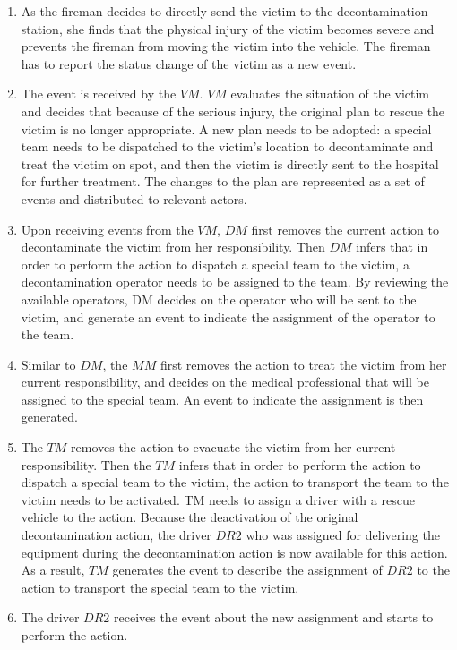 \begin{enumerate}
	\item As the fireman decides to directly send the victim to the decontamination station, she finds that the physical injury of the victim becomes severe and prevents the fireman from moving the victim into the vehicle. The fireman has to report the status change of the victim as a new event.
	\item The event is received by the $VM$. $VM$ evaluates the situation of the victim and decides that because of the serious injury, the original plan to rescue the victim is no longer appropriate. A new plan needs to be adopted: a special team needs to be dispatched to the victim’s location to decontaminate and treat the victim on spot, and then the victim is directly sent to the hospital for further treatment. The changes to the plan are represented as a set of events and distributed to relevant actors.
	\item Upon receiving events from the $VM$, $DM$ first removes the current action to decontaminate the victim from her responsibility. Then $DM$ infers that in order to perform the action to dispatch a special team to the victim, a decontamination operator needs to be assigned to the team. By reviewing the available operators, DM decides on the operator who will be sent to the victim, and generate an event to indicate the assignment of the operator to the team.
	\item Similar to $DM$, the $MM$ first removes the action to treat the victim from her current responsibility, and decides on the medical professional that will be assigned to the special team. An event to indicate the assignment is then generated.
	\item The $TM$ removes the action to evacuate the victim from her current responsibility. Then the $TM$ infers that in order to perform the action to dispatch a special team to the victim, the action to transport the team to the victim needs to be activated. TM needs to assign a driver with a rescue vehicle to the action. Because the deactivation of the original decontamination action, the driver $DR2$ who was assigned for delivering the equipment during the decontamination action is now available for this action. As a result, $TM$ generates the event to describe the assignment of $DR2$ to the action to transport the special team to the victim.
	\item The driver $DR2$ receives the event about the new assignment and starts to perform the action.
\end{enumerate}

